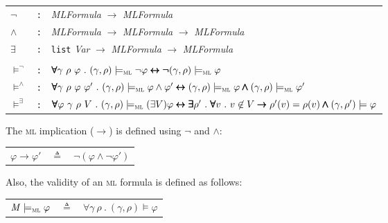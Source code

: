 \documentclass[conference]{IEEEtran}
\newcommand{\M}{\mathit{M}}
\newcommand{\eqbydef}{\triangleq}
\renewcommand{\implies}{\rightarrow}
\newcommand{\ML}{\textsc{ml}\xspace}
\newcommand{\modelsml}{\models_\ML}
\newcommand{\coq}[1]{{\small \textit{#1}}}
\newcommand{\coqtt}[1]{{\small \texttt{#1}}}
\newcommand{\cnot}{\pmb{\lnot}}
\newcommand{\cand}{\pmb{\land}}
\newcommand{\cexists}{\pmb{\exists}}
\newcommand{\cforall}{\pmb{\forall}}
\newcommand{\cimplies}{\pmb{\rightarrow}}
\newcommand{\cequiv}{\pmb{\leftrightarrow}}
\begin{document}
\noindent
\begin{minipage}{\textwidth}
\begin{tabular}{lcl}
 \coq{$\lnot$} & \coqtt{:}& \coq{MLFormula} $\to$ \coq{MLFormula} \\
 \coq{$\land$} & \coqtt{:}& \coq{MLFormula} $\to$ \coq{MLFormula} $\to$ \coq{MLFormula}\\
 \coq{$\exists$} & \coqtt{:}& \coqtt{list} \coq{Var} $\to$ \coq{MLFormula} $\to$ \coq{MLFormula}\\\\

$\models^\lnot$  & \coqtt{:}& $\cforall \gamma~\rho~\varphi~.~(\gamma, \rho) \modelsml \lnot \varphi  \cequiv \cnot (\gamma, \rho) \modelsml \varphi$\\ 
 $\models^\land$  & \coqtt{:}& $\cforall \gamma~\rho~\varphi~\varphi'~.~(\gamma, \rho) \modelsml \varphi \land \varphi' \cequiv (\gamma, \rho) \modelsml \varphi \cand (\gamma, \rho) \modelsml \varphi' $\\
 $\models^\exists$  & \coqtt{:}& $\cforall \varphi~\gamma~\rho~V~.~(\gamma, \rho) \modelsml (\exists V)\varphi \cequiv  \cexists \rho'~.~\cforall v~.~v \not\in V \cimplies \rho'(v) = \rho(v)  \cand (\gamma, \rho') \models \varphi$\\[2ex]
\end{tabular}
\end{minipage}

\noindent
The \ML implication ($\implies$) is defined using $\lnot$ and $\land$:\\

\begin{minipage}{\textwidth}
\begin{tabular}{lcl}
$\varphi \implies \varphi'$ & $\eqbydef$ & $\lnot(\varphi \land \lnot \varphi')$\\
\end{tabular}
\end{minipage}

\noindent
Also, the validity of an \ML formula is defined as follows:\\

\begin{minipage}{\textwidth}
\begin{tabular}{lcl}
$\M \modelsml \varphi$ & $\eqbydef$ & $\cforall \gamma~\rho~.~ (\gamma,\rho)\models\varphi$\\[2ex]
\end{tabular}
\end{minipage}
\end{document}
